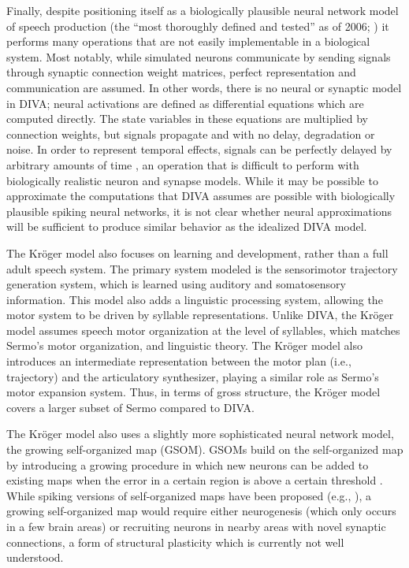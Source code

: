 Finally, despite positioning itself as
a biologically plausible neural network model
of speech production
(the ``most thoroughly defined and tested''
as of 2006; \citealp{guenther2006a})
it performs many operations
that are not easily implementable
in a biological system.
Most notably,
while simulated neurons communicate
by sending signals through
synaptic connection weight matrices,
perfect representation and communication
are assumed.
In other words, there is no neural
or synaptic model in DIVA;
neural activations are defined as
differential equations
which are computed directly.
The state variables in these equations
are multiplied by connection weights,
but signals propagate
and with no delay, degradation or noise.
In order to represent temporal effects,
signals can be perfectly delayed
by arbitrary amounts of time
\citep{nieto-castanon2011},
an operation that is difficult
to perform with biologically realistic
neuron and synapse models.
While it may be possible to approximate
the computations that
DIVA assumes are possible
with biologically plausible spiking neural networks,
it is not clear whether
neural approximations will
be sufficient to produce similar behavior
as the idealized DIVA model.

The Kr\"{o}ger model also
focuses on learning and development,
rather than a full adult speech system.
The primary system modeled
is the sensorimotor trajectory generation system,
which is learned using
auditory and somatosensory information.
This model also adds
a linguistic processing system,
allowing the motor system to be driven
by syllable representations.
Unlike DIVA, the Kr\"{o}ger model
assumes speech motor organization
at the level of syllables,
which matches Sermo's motor organization,
and linguistic theory.
The Kr\"{o}ger model also
introduces an intermediate representation
between the motor plan (i.e., trajectory)
and the articulatory synthesizer,
playing a similar role as Sermo's
motor expansion system.
Thus, in terms of gross structure,
the Kr\"{o}ger model covers a larger subset
of Sermo compared to DIVA.

The Kr\"{o}ger model also uses
a slightly more sophisticated neural network model,
the growing self-organized map (GSOM).
GSOMs build on the self-organized map
\citep{kohonen1982,kohonen2007}
by introducing a growing procedure
in which new neurons can be added
to existing maps when the error
in a certain region is above
a certain threshold
\citep{cao2014}.
While spiking versions of
self-organized maps
have been proposed
(e.g., \citealp{choe1998}),
a growing self-organized map
would require either neurogenesis
(which only occurs in a few brain areas)
or recruiting neurons in nearby areas
with novel synaptic connections,
a form of structural plasticity
which is currently not well understood.

